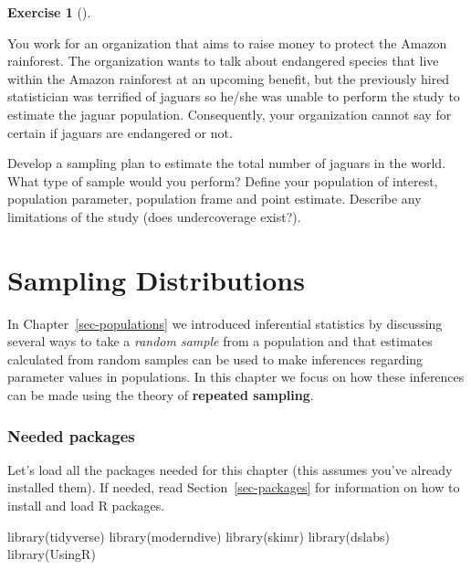 \documentclass[
  letterpaper,
  DIV=11,
  numbers=noendperiod]{scrreprt}
\newenvironment{Shaded}{\begin{snugshade}}{\end{snugshade}}
\newcommand{\FunctionTok}[1]{\textcolor[rgb]{0.28,0.35,0.67}{#1}}
\newcommand{\NormalTok}[1]{\textcolor[rgb]{0.00,0.23,0.31}{#1}}
\theoremstyle{definition}
\newtheorem{exercise}{Exercise}[chapter]
\theoremstyle{remark}
\begin{document}
\begin{exercise}[]\protect\hypertarget{exr-ch08-adv1}{}\label{exr-ch08-adv1}

You work for an organization that aims to raise money to protect the
Amazon rainforest. The organization wants to talk about endangered
species that live within the Amazon rainforest at an upcoming benefit,
but the previously hired statistician was terrified of jaguars so he/she
was unable to perform the study to estimate the jaguar population.
Consequently, your organization cannot say for certain if jaguars are
endangered or not.

Develop a sampling plan to estimate the total number of jaguars in the
world. What type of sample would you perform? Define your population of
interest, population parameter, population frame and point estimate.
Describe any limitations of the study (does undercoverage exist?).

\end{exercise}

\hypertarget{sec-sampling}{%
\chapter{Sampling Distributions}\label{sec-sampling}}

In Chapter~\ref{sec-populations} we introduced inferential statistics by
discussing several ways to take a \emph{random sample} from a population
and that estimates calculated from random samples can be used to make
inferences regarding parameter values in populations. In this chapter we
focus on how these inferences can be made using the theory of
\textbf{repeated sampling}.

\hypertarget{needed-packages-3}{%
\subsection*{Needed packages}\label{needed-packages-3}}

Let's load all the packages needed for this chapter (this assumes you've
already installed them). If needed, read Section~\ref{sec-packages} for
information on how to install and load R packages.

\begin{Shaded}
\begin{Highlighting}[]
\FunctionTok{library}\NormalTok{(tidyverse)}
\FunctionTok{library}\NormalTok{(moderndive)}
\FunctionTok{library}\NormalTok{(skimr)}
\FunctionTok{library}\NormalTok{(dslabs)}
\FunctionTok{library}\NormalTok{(UsingR)}
\end{Highlighting}
\end{Shaded}
\end{document}
